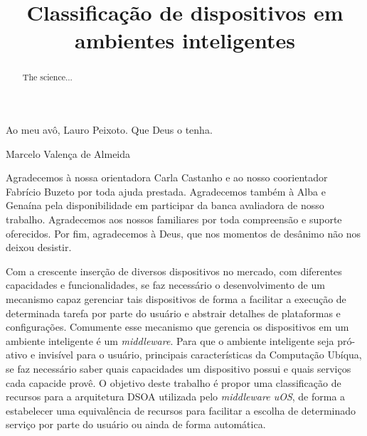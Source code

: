 \documentclass[bacharelado]{unb-cic}
\title{Classificação de dispositivos em ambientes inteligentes}
\begin{document}
  \lstset{tabsize=4}
  \renewcommand\lstlistingname{Listagem}
  \renewcommand\lstlistlistingname{Listagens}
  \maketitle
  \pretextual

  \begin{dedicatoria}
  Ao meu avô, Lauro Peixoto. Que Deus o tenha.
  \begin{flushright}Marcelo Valença de Almeida\end{flushright}
  \end{dedicatoria}

  \begin{agradecimentos}
  Agradecemos à nossa orientadora \dr[a] Carla Castanho e ao nosso coorientador Fabrício Buzeto por toda ajuda prestada. Agradecemos também à \dr[a] Alba e \dr[a] Genaína pela disponibilidade em participar da banca avaliadora de nosso trabalho. Agradecemos aos nossos familiares por toda compreensão e suporte oferecidos. Por fim, agradecemos à Deus, que nos momentos de desânimo não nos deixou desistir.
  \end{agradecimentos}

  \begin{resumo}
  Com a crescente inserção de diversos dispositivos no mercado, com diferentes capacidades e funcionalidades, se faz necessário o desenvolvimento de um mecanismo capaz gerenciar tais dispositivos de forma a facilitar a execução de determinada tarefa por parte do usuário e abstrair detalhes de plataformas e configurações. Comumente esse mecanismo que gerencia os dispositivos em um ambiente inteligente é um \emph{middleware}. Para que o ambiente inteligente seja pró-ativo e invisível para o usuário, principais características da Computação Ubíqua, se faz necessário saber quais capacidades um dispositivo possui e quais serviços cada capacide provê. O objetivo deste trabalho é propor uma classificação de recursos para a arquitetura DSOA utilizada pelo \emph{middleware uOS}, de forma a estabelecer uma equivalência de recursos para facilitar a escolha de determinado serviço por parte do usuário ou ainda de forma automática. 
  \end{resumo}

  \begin{abstract} 
  The science...
  \end{abstract}

  \tableofcontents
  \listoffigures
  \listoftables

  \textual
  
  
  
  
  

  \postextual
  
  
\end{document}
